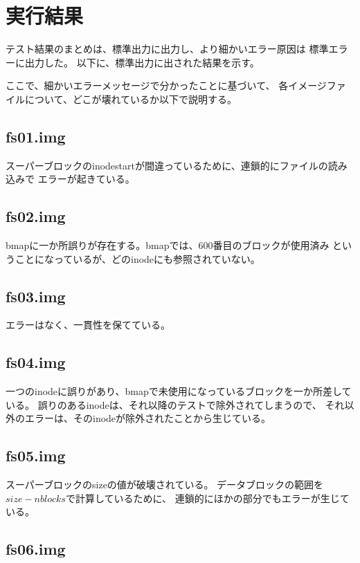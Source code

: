 \documentclass[a4j,11pt]{jarticle}
\begin{document}
\section{実行結果}

テスト結果のまとめは、標準出力に出力し、より細かいエラー原因は
標準エラーに出力した。
以下に、標準出力に出された結果を示す。



ここで、細かいエラーメッセージで分かったことに基づいて、
各イメージファイルについて、どこが壊れているか以下で説明する。

\subsection*{fs01.img}

スーパーブロックのinodestartが間違っているために、連鎖的にファイルの読み込みで
エラーが起きている。

\subsection*{fs02.img}

bmapに一か所誤りが存在する。bmapでは、600番目のブロックが使用済み
ということになっているが、どのinodeにも参照されていない。

\subsection*{fs03.img}

エラーはなく、一貫性を保てている。

\subsection*{fs04.img}

一つのinodeに誤りがあり、bmapで未使用になっているブロックを一か所差している。
誤りのあるinodeは、それ以降のテストで除外されてしまうので、
それ以外のエラーは、そのinodeが除外されたことから生じている。

\subsection*{fs05.img}

スーパーブロックのsizeの値が破壊されている。
データブロックの範囲を$size - nblocks$で計算しているために、
連鎖的にほかの部分でもエラーが生じている。

\subsection*{fs06.img}
\end{document}
